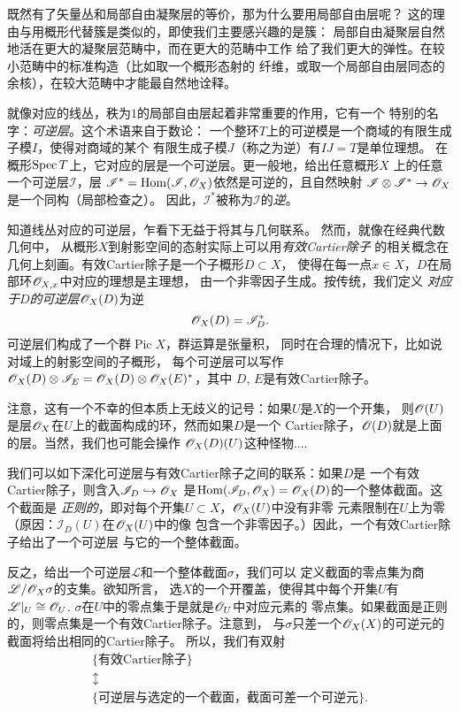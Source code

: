 既然有了矢量丛和局部自由凝聚层的等价，那为什么要用局部自由层呢？
这的理由与用概形代替簇是类似的，即使我们主要感兴趣的是簇：
局部自由凝聚层自然地活在更大的凝聚层范畴中，而在更大的范畴中工作
给了我们更大的弹性。在较小范畴中的标准构造（比如取一个概形态射的
纤维，或取一个局部自由层同态的余核），在较大范畴中才能最自然地诠释。

就像对应的线丛，秩为$1$的局部自由层起着非常重要的作用，它有一个
特别的名字：\textit{可逆层}。这个术语来自于数论：
一个整环$T$上的可逆模是一个商域的有限生成子模$I$，使得对商域的某个
有限生成子模$J$（称之为逆）有$IJ=T$是单位理想。%
在概形$\operatorname{Spec} T$上，它对应的层是一个可逆层。更一般地，给出任意概形$X$
上的任意一个可逆层$\mathscr I$，层
$\mathscr I^*=\operatorname{Hom}(\mathscr I,\mathscr{O}_X)$依然是可逆的，且自然映射
$\mathscr I\otimes \mathscr I^*\to \mathscr{O}_X$是一个同构（局部检查之）。
因此，$\mathscr I^*$被称为$\mathscr I$的\textit{逆}。

知道线丛对应的可逆层，乍看下无益于将其与几何联系。
然而，就像在经典代数几何中，
从概形$X$到射影空间的态射实际上可以用\textit{有效Cartier除子}
的相关概念在几何上刻画。有效Cartier除子是一个子概形$D\subset X$，
使得在每一点$x\in X$，$D$在局部环$\mathscr{O}_{X,x}$中对应的理想是主理想，
由一个非零因子生成。按传统，我们定义
\textit{对应于$D$的可逆层$\mathscr{O}_X(D)$}为逆
\[
	\mathscr{O}_X(D)=\mathscr I_D^*.
\]
可逆层们构成了一个群$\operatorname{Pic} X$，群运算是张量积，
同时在合理的情况下，比如说对域上的射影空间的子概形，
每个可逆层可以写作
$\mathscr{O}_X(D)\otimes \mathscr I_E=\mathscr{O}_X(D)\otimes \mathscr{O}_X(E)^*$，其中
$D$, $E$是有效Cartier除子。

注意，这有一个不幸的但本质上无歧义的记号：如果$U$是$X$的一个开集，
则$\mathscr{O}(U)$是层$\mathscr{O}_X$在$U$上的截面构成的环，然而如果$D$是一个
Cartier除子，$\mathscr{O}(D)$就是上面的层。当然，我们也可能会操作
$\mathscr{O}_X(D)(U)$这种怪物....

我们可以如下深化可逆层与有效Cartier除子之间的联系：如果$D$是
一个有效Cartier除子，则含入$\mathscr I_D\hookrightarrow \mathscr{O}_X$
是$\operatorname{Hom}(\mathscr I_D,\mathscr{O}_X)=\mathscr{O}_X(D)$的一个整体截面。这个截面是
\textit{正则的}，即对每个开集$U\subset X$，$\mathscr{O}_X(U)$中没有非零
元素限制在$U$上为零（原因：$\mathscr I_D(U)$在$\mathscr{O}_X(U)$中的像
包含一个非零因子。）因此，一个有效Cartier除子给出了一个可逆层
与它的一个整体截面。

反之，给出一个可逆层$\mathscr L$和一个整体截面$\sigma$，我们可以
定义截面的零点集为商$\mathscr L/\mathscr{O}_X\sigma$的支集。欲知所言，
选$X$的一个开覆盖，使得其中每个开集$U$有$\mathscr L|_{U}
\cong \mathscr{O}_U$. $\sigma$在$U$中的零点集于是就是$\mathscr{O}_U$中对应元素的
零点集。如果截面是正则的，则零点集是一个有效Cartier除子。注意到，
与$\sigma$只差一个$\mathscr{O}_X(X)$的可逆元的截面将给出相同的Cartier除子。
所以，我们有双射
\[
	\begin{array}{c}
	\{\text{有效Cartier除子}\}\\
	\updownarrow \\
	\{\text{可逆层与选定的一个截面，截面可差一个可逆元}\}.
	\end{array}
\]

